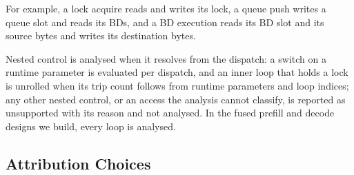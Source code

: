 For example, a lock acquire reads and writes its lock, a queue push writes a queue slot and reads its BDs, and a BD execution reads its BD slot and its source bytes and writes its destination bytes.

Nested control is analysed when it resolves from the dispatch: a switch on a runtime parameter is evaluated per dispatch, and an inner loop that holds a lock is unrolled when its trip count follows from runtime parameters and loop indices; any other nested control, or an access the analysis cannot classify, is reported as unsupported with its reason and not analysed. In the fused prefill and decode designs we build, every loop is analysed.

\subsection{Attribution Choices}
\label{app:attribution-choices}

